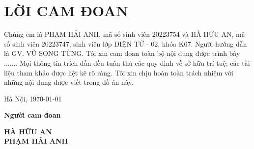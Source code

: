 \section*{LỜI CAM ĐOAN}
\thispagestyle{empty}
Chúng em là PHẠM HẢI ANH, mã số sinh viên 20223754 và HÀ HỮU AN, mã số sinh viên 20223747, sinh viên lớp ĐIỆN TỬ - 02, khóa K67. Người hướng dẫn là GV. VŨ SONG TÙNG. Tôi xin cam đoan toàn bộ nội dung được trình bày ....... Mọi thông tin trích dẫn đều tuân thủ các quy định về sở hữu trí tuệ; các tài liệu tham khảo được liệt kê rõ ràng. Tôi xin chịu hoàn toàn trách nhiệm với những nội dung được viết trong đồ án này.

\vspace{6pt}
\hspace{8.3cm}Hà Nội, \today

\hspace{9cm}\textbf{Người cam đoan}

\vspace{2cm}
\hspace{9.25cm}\textbf{HÀ HỮU AN}\\

\hspace{9.25cm}\textbf{PHẠM HẢI ANH}
\cleardoublepage